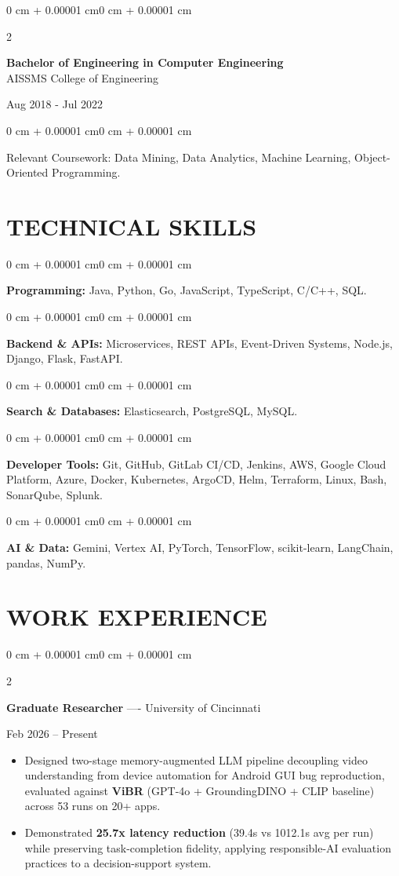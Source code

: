 \documentclass[10pt, letterpaper]{article}
\newenvironment{highlights}{
    \begin{itemize}[
        topsep=0.10 cm,
        parsep=0.06 cm,
        partopsep=0pt,
        itemsep=0.06 cm,
        leftmargin=12pt
    ]
}{
    \end{itemize}
}
\newenvironment{onecolentry}{
    \begin{adjustwidth}{0 cm + 0.00001 cm}{0 cm + 0.00001 cm}
}{
    \end{adjustwidth}
}
\newenvironment{twocolentry}[2][]{
    \onecolentry
    \def\secondColumn{#2}
    \setcolumnwidth{\fill, 4.5 cm}
    \begin{paracol}{2}
}{
    \switchcolumn \raggedleft \secondColumn
    \end{paracol}
    \endonecolentry
}
\begin{document}
\begin{twocolentry}{
    Aug 2018 - Jul 2022
}
    \textbf{Bachelor of Engineering in Computer Engineering} \\
    AISSMS College of Engineering
\end{twocolentry}
\begin{onecolentry}
Relevant Coursework: Data Mining, Data Analytics, Machine Learning, Object-Oriented Programming.
\end{onecolentry}
\section{TECHNICAL SKILLS}
\begin{onecolentry}
\textbf{Programming:} Java, Python, Go, JavaScript, TypeScript, C/C++, SQL.
\end{onecolentry}
\vspace{0.06 cm}
\begin{onecolentry}
\textbf{Backend \& APIs:} Microservices, REST APIs, Event-Driven Systems, Node.js, Django, Flask, FastAPI.
\end{onecolentry}
\vspace{0.06 cm}
\begin{onecolentry}
\textbf{Search \& Databases:} Elasticsearch, PostgreSQL, MySQL.
\end{onecolentry}
\vspace{0.06 cm}
\begin{onecolentry}
\textbf{Developer Tools:} Git, GitHub, GitLab CI/CD, Jenkins, AWS, Google Cloud Platform, Azure, Docker, Kubernetes, ArgoCD, Helm, Terraform, Linux, Bash, SonarQube, Splunk.
\end{onecolentry}
\vspace{0.06 cm}
\begin{onecolentry}
\textbf{AI \& Data:} Gemini, Vertex AI, PyTorch, TensorFlow, scikit-learn, LangChain, pandas, NumPy.
\end{onecolentry}

\section{WORK EXPERIENCE}
\begin{twocolentry}{Feb 2026 -- Present}
\textbf{Graduate Researcher} ---- University of Cincinnati
\end{twocolentry}
\begin{highlights}
  \item Designed two-stage memory-augmented LLM pipeline decoupling video understanding from device automation for Android GUI bug reproduction, evaluated against \textbf{ViBR} (GPT-4o + GroundingDINO + CLIP baseline) across 53 runs on 20+ apps.
  \item Demonstrated \textbf{25.7x latency reduction} (39.4s vs 1012.1s avg per run) while preserving task-completion fidelity, applying responsible-AI evaluation practices to a decision-support system.
\end{highlights}
\end{document}
